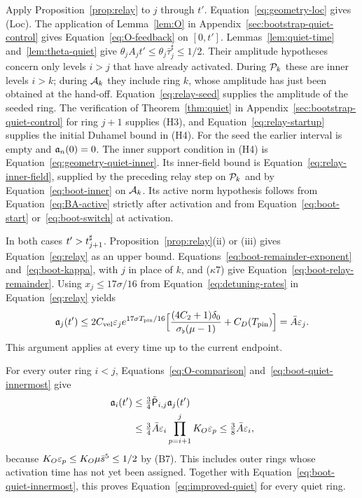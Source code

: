 Apply Proposition~\ref{prop:relay} to $j$ through $t'$.
Equation~\eqref{eq:geometry-loc} gives (Loc). The application of
Lemma~\ref{lem:O} in Appendix~\ref{sec:bootstrap-quiet-control} gives
Equation~\eqref{eq:O-feedback} on $[0,t']$.
Lemmas~\ref{lem:quiet-time} and~\ref{lem:theta-quiet} give
$\theta_jA_jt'\le\theta_j\bar\tau^\sharp_j\le1/2$.
Their amplitude hypotheses concern only levels $i>j$ that have already
activated. During $\mathcal{P}_k$ these are inner levels $i>k$; during $\mathcal{A}_k$
they include ring $k$, whose amplitude has just been obtained at the hand-off.
Equation~\eqref{eq:relay-seed} supplies the amplitude of the seeded ring.
The verification of Theorem~\ref{thm:quiet} in
Appendix~\ref{sec:bootstrap-quiet-control} for ring $j+1$ supplies (H3), and
Equation~\eqref{eq:relay-startup} supplies the initial Duhamel bound in (H4).
For the seed the earlier interval is empty and $\mathfrak{a}_n(0)=0$.
The inner support condition in (H4) is Equation~\eqref{eq:geometry-quiet-inner}.
Its inner-field bound is Equation~\eqref{eq:relay-inner-field}, supplied by
the preceding relay step on $\mathcal{P}_k$ and by Equation~\eqref{eq:boot-inner}
on $\mathcal{A}_k$. Its active norm hypothesis follows from
Equation~\eqref{eq:BA-active} strictly after activation and from
Equation~\eqref{eq:boot-start} or~\eqref{eq:boot-switch} at activation.

In both cases $t'>t^\sharp_{j+1}$. Proposition~\ref{prop:relay}(ii) or (iii) gives
Equation~\eqref{eq:relay} as an upper bound.
Equations~\eqref{eq:boot-remainder-exponent} and~\eqref{eq:boot-kappa}, with
$j$ in place of $k$, and ($\kappa$7) give Equation~\eqref{eq:boot-relay-remainder}.
Using $x_j\le17\sigma/16$ from Equation~\eqref{eq:detuning-rates} in
Equation~\eqref{eq:relay} yields
\begin{equation}
\label{eq:boot-quiet-innermost}
\mathfrak{a}_j(t')\le2C_{\mathrm{vel}}\varepsilon_je^{17\sigma T_{\mathrm{pin}}/16}
\Big[\frac{(4C_2+1)\delta_0}{\sigma_\flat(\mu-1)}+C_D(T_{\mathrm{pin}})\Big]
=\bar A\varepsilon_j.
\end{equation}
This argument applies at every time up to the current endpoint.

For every outer ring $i<j$, Equations~\eqref{eq:O-comparison} and~\eqref{eq:boot-quiet-innermost} give
\begin{equation}
\label{eq:boot-quiet-outer}
\begin{aligned}
\mathfrak{a}_i(t')&\le\tfrac34\tilde{\mathsf{P}}_{i,j}\mathfrak{a}_j(t')\\
&\le\tfrac34\bar A\varepsilon_i
       \prod_{p=i+1}^{j}K_{O}\varepsilon_p
\le\tfrac38\bar A\varepsilon_i,
\end{aligned}
\end{equation}
because $K_{O}\varepsilon_p\le K_{O}\mu\bar s^5\le1/2$ by (B7).
This includes outer rings whose activation time has not yet been assigned.
Together with Equation~\eqref{eq:boot-quiet-innermost}, this proves
Equation~\eqref{eq:improved-quiet} for every quiet ring.
